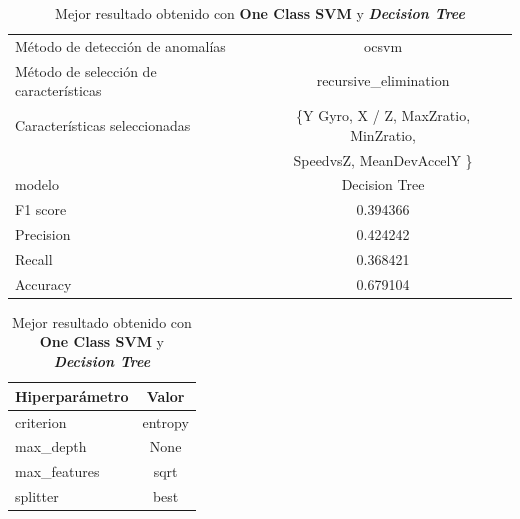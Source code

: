 \begin{appendices}
		\begin{table}[htb]
			\centering
			\caption{Mejor resultado obtenido con \textbf{One Class SVM} y \textbf{\emph{Decision Tree}}}
			\label{table:24}
			\begin{tabular}{lc}
				\toprule
					  Método de detección de anomalías &                                              ocsvm \\
				Método de selección de características &                              recursive\_elimination \\
						 Características seleccionadas & \{Y Gyro, X / Z, MaxZratio, MinZratio, \\
						 							   &   SpeedvsZ,  MeanDevAccelY \}\\
												modelo &                                      Decision Tree \\
											  F1 score &                                           0.394366 \\
											 Precision &                                           0.424242 \\
												Recall &                                           0.368421 \\
											  Accuracy &                                           0.679104 \\
				\bottomrule
			\end{tabular}
			\newline
			\newline

			\begin{tabular}{lc}
				\toprule
				Hiperparámetro &   Valor \\
				\midrule
					 criterion & entropy \\
					 max\_depth &    None \\
				  max\_features &    sqrt \\
					  splitter &    best \\
				\bottomrule
			\end{tabular}
			
		\end{table}


\end{appendices}
